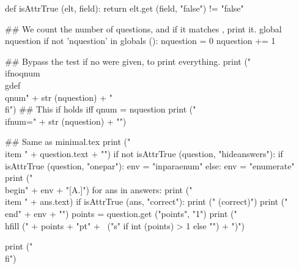 \documentclass{article}
\newif\ifnoqnum
\begin{document}
\begin{enumerate}
\begin{preview}

def isAttrTrue (elt, field):
    return elt.get (field, "false") != "false"

## We count the number of questions, and if it matches \qnum, print it.
global nquestion
if not 'nquestion' in globals ():
  nquestion = 0
nquestion += 1

## Bypass the test if no \qnum were given, to print everything.
print ("\\ifnoqnum\\gdef\\qnum{" + str (nquestion) + "}\\fi")
## This if holds iff qnum = nquestion
print ("\\ifnum\qnum=" + str (nquestion) + "")

## Same as minimal.tex
print ("\\item " + question.text + "\n\n")
if not isAttrTrue (question, "hideanswers"):
  if isAttrTrue (question, "onepar"):
    env = "inparaenum"
  else:
    env = "enumerate"
  print ("\\begin{" + env + "}[A.]")
  for ans in answers:
    print ("\\item " + ans.text)
    if isAttrTrue (ans, "correct"):
      print (" (correct)")
  print ("\\end{" + env + "}")
points = question.get ("points", "1")
print ("\\hfill (" + points + "pt" + \
                ("s" if int (points) > 1 else "") + ")\n")

print ("\\fi")

\end{preview}
\end{enumerate}
\end{document}
